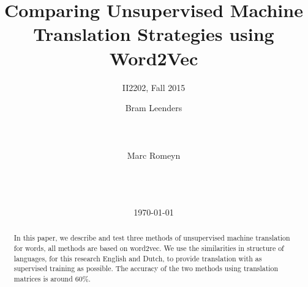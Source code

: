 \documentclass{acm_proc_article-sp}
\begin{document}
\title{Comparing Unsupervised Machine Translation Strategies using Word2Vec}
\subtitle{II2202, Fall 2015}


\author{
%
%
\alignauthor
Bram Leenders\\
       \\
       \\
       \\
\alignauthor
Marc Romeyn\\
       \\
       \\
       \\
}

\date{\today}

\maketitle
\begin{abstract}
In this paper, we describe and test three methods of unsupervised machine translation for words, all methods are based on word2vec. We use the similarities in structure of languages, for this research English and Dutch, to provide translation with as supervised training as possible. The accuracy of the two methods using translation matrices is around 60\%.
\end{abstract}
\end{document}
